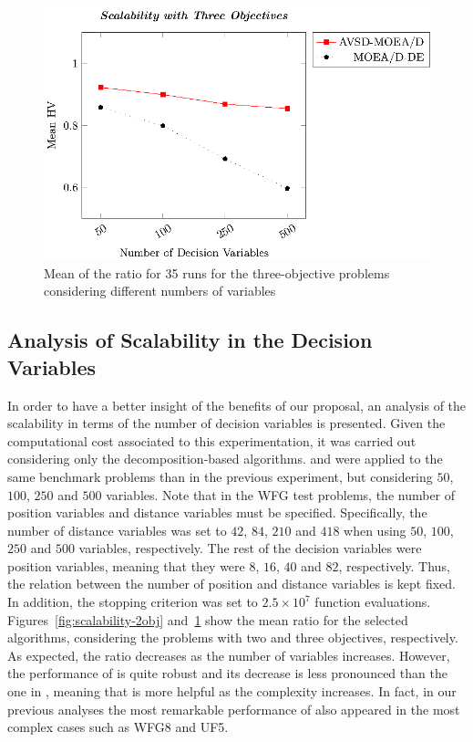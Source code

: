 \begin{figure}[t]
\centering
\includegraphics[scale=0.70]{images/Graphic-Scalability-3obj_tikz-figure0.eps}
\caption{Mean of the \HV{} ratio for 35 runs for the three-objective problems considering different numbers of variables} \label{fig:scalability-3obj}
\end{figure}

\subsection{Analysis of Scalability in the Decision Variables}

In order to have a better insight of the benefits of our proposal, an analysis of the scalability in terms of the number 
of decision variables is presented.
%
Given the computational cost associated to this experimentation, it was carried out considering only 
the decomposition-based algorithms.
%
\AVSDMOEAD{} and \MOEADDE{} were applied to the same benchmark problems than in the previous experiment, 
but considering $50$, $100$, $250$ and $500$ variables.
%
Note that in the WFG test problems, the number of position variables and distance variables must be specified.
%
Specifically, the number of distance variables was set to $42$, $84$, $210$ and $418$ when using $50$, $100$, $250$ and $500$ 
variables, respectively.
%
The rest of the decision variables were position variables, meaning that they were $8$, $16$, $40$ and $82$, respectively.
%
Thus, the relation between the number of position and distance variables is kept fixed.
%
In addition, the stopping criterion was set to $2.5 \times 10^7$ function evaluations.
%
Figures~\ref{fig:scalability-2obj} and~\ref{fig:scalability-3obj} show the mean \HV{} ratio for the selected algorithms, 
considering the problems with two and three objectives, respectively.
%
As expected, the \HV{} ratio decreases as the number of variables increases.
%
However, the performance of \AVSDMOEAD{} is quite robust and its decrease is less pronounced than the one in \MOEADDE{},
meaning that \AVSDMOEAD{} is more helpful as the complexity increases.
%
In fact, in our previous analyses the most remarkable performance of \AVSDMOEAD{} also appeared in the most complex cases such
as WFG8 and UF5.
%



